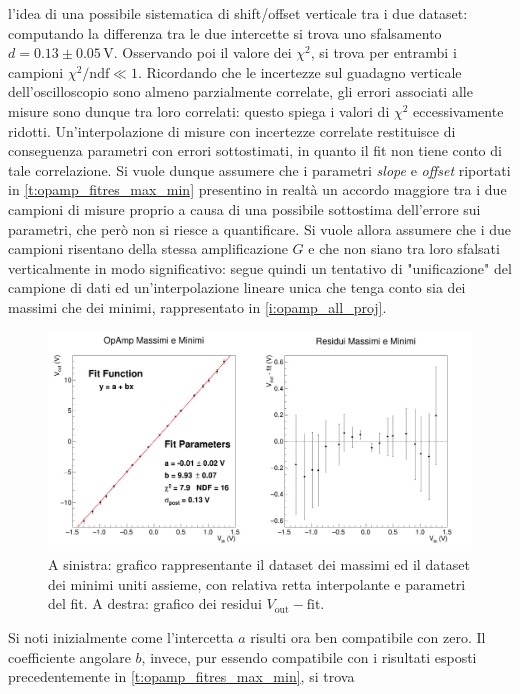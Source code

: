 \documentclass[a4paper,11pt]{article} %
\begin{document}
l'idea di una possibile sistematica di shift/offset verticale tra i due dataset: computando la differenza tra le due
intercette si trova uno sfalsamento $d=0.13 \pm 0.05 \,\si{\volt}$. Osservando poi il valore dei $\chi^2$, si trova per
entrambi i campioni $\chi^2/\text{ndf} \ll 1$. Ricordando che le incertezze sul guadagno verticale dell'oscilloscopio
sono almeno parzialmente correlate, gli errori associati alle misure sono dunque tra loro correlati: questo spiega i
valori di $\chi^2$ eccessivamente ridotti. Un'interpolazione di misure con incertezze correlate restituisce di
conseguenza parametri con errori sottostimati, in quanto il fit non tiene conto di tale correlazione. Si vuole dunque
assumere che i parametri \textit{slope} e \textit{offset} riportati in \autoref{t:opamp_fitres_max_min} presentino in
realtà un accordo maggiore tra i due campioni di misure proprio a causa di una possibile sottostima dell'errore sui
parametri, che però non si riesce a quantificare. Si vuole allora assumere che i due campioni risentano della stessa
amplificazione $G$ e che non siano tra loro sfalsati verticalmente in modo significativo: segue quindi un tentativo di
"unificazione" del campione di dati ed un'interpolazione lineare unica che tenga conto sia dei massimi che dei minimi,
rappresentato in \autoref{i:opamp_all_proj}. 
\begin{figure}[H]
	\centering
	\includegraphics[width=\linewidth]{../Plots/Report_Plots/opamp_plot_all_projected.png}
	\caption{\small A sinistra: grafico rappresentante il dataset dei massimi ed il dataset dei minimi uniti assieme, 
	con relativa retta interpolante e parametri del fit. A destra: grafico dei residui $V_{\text{out}}-\text{fit}$.}
	\label{i:opamp_all_proj}
\end{figure}
\noindent Si noti inizialmente come l'intercetta $a$ risulti ora ben compatibile con zero. Il coefficiente angolare $b$,
invece, pur essendo compatibile con i risultati esposti precedentemente in \autoref{t:opamp_fitres_max_min}, si trova
\end{document}
